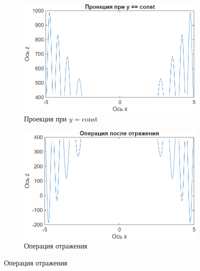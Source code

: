 \begin{figure}[h!]
    \centering

    \begin{subfigure}{0.48\textwidth}
        \centering
        \includegraphics[width=\linewidth]{figs/ex6_1.png}
        \caption{Проекция при $y=\text{const}$}
        \label{fig:ex6_1} %
    \end{subfigure}
    \hfill %
    \begin{subfigure}{0.48\textwidth}
        \centering
        \includegraphics[width=\linewidth]{figs/ex6_2.png}
        \caption{Операция отражения}
        \label{fig:ex6_2}
    \end{subfigure}

    \vspace{0.5cm} %


\end{figure}
